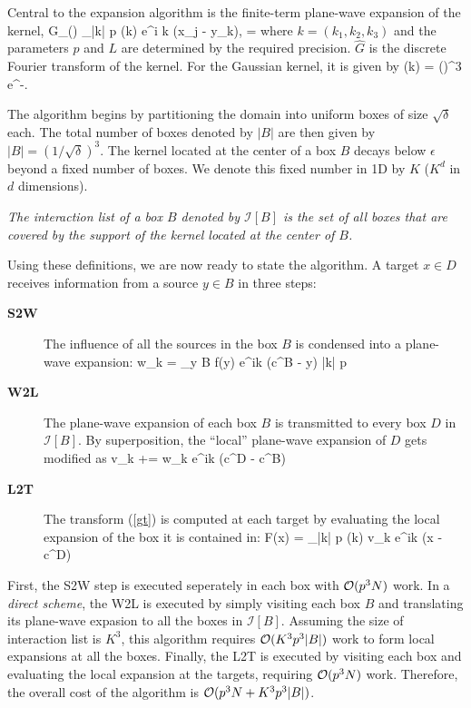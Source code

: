 Central to the expansion algorithm is the finite-term plane-wave expansion of the kernel,
\beq G_\delta() \approx \sum_{|k| \leq p} (k) e^{i \lambda k \cdot (x_j - y_k)}, \quad \lambda = \eeq
where $k = (k_1, k_2, k_3)$ and the parameters $p$ and $L$ are determined by the required precision. $\hat{G}$ is the discrete Fourier transform of the kernel. For the Gaussian kernel, it is given by
\beq {}(k) = \left(\right)^3 e^{-}. \label{eqn:ghat}\eeq

The algorithm begins by partitioning the domain into uniform boxes of size $\sqrt{\delta}$ each. The total number of boxes denoted by $|B|$ are then given by $|B| = (1/\sqrt{\delta})^3$. The kernel located at the center of a box $B$ decays below $\epsilon$ beyond a fixed number of boxes. We denote this fixed number in 1D by $K$ ($K^d$ in $d$ dimensions). 

\begin{mydef} {\em The interaction list of a box $B$ denoted by $\mathcal{I}[B]$ is the set of all boxes that are covered by the support of the kernel located at the center of $B$. }
\end{mydef} 
%
Using these definitions, we are now ready to state the algorithm. A target $x \in D$ receives information from a source $y \in B$ in three steps:
\begin{description}
\item[\textbf{S2W}] The influence of all the sources in the box $B$ is condensed into a plane-wave expansion:
            \beq w_k = \sum_{y \in B} f(y) e^{i\lambda k \cdot (c^B - y)} \quad \forall\quad |k| \leq p  \label{eqn:s2w} \eeq
            
\item[\textbf{W2L}] The plane-wave expansion of each box $B$ is transmitted to every box $D$ in $\mathcal{I}[B]$. By
 superposition, the ``local'' plane-wave expansion of $D$ gets modified as
            \beq v_k += w_k e^{i\lambda k \cdot (c^D - c^B)} \label{e:w2l}\eeq
            
\item[\textbf{L2T}] The transform (\ref{gt}) is computed at each target by evaluating the local expansion of the 
box it is contained in:
            \beq F(x) = \sum_{|k| \leq p} (k) v_k e^{i\lambda k \cdot (x - c^D)} \label{eqn:l2t}\eeq
\end{description} 

First, the S2W step is executed seperately in each box with $\mathcal{O}(p^3 N)$ work. In a {\em direct scheme}, 
the W2L is executed by simply visiting each box $B$ and translating its plane-wave expasion to all the boxes
 in $\mathcal{I}[B]$. Assuming the size of interaction list is $K^3$, this algorithm requires $\mathcal{O}(K^3 p^3 |B|)$ work 
 to form local expansions at all the boxes. Finally, the L2T is executed by visiting each box and evaluating the 
 local expansion at the targets, requiring $\mathcal{O}(p^3 N)$ work. Therefore, the overall cost of the algorithm is $\mathcal{O}(p^3 N + K^3 p^3 |B|)$.  

